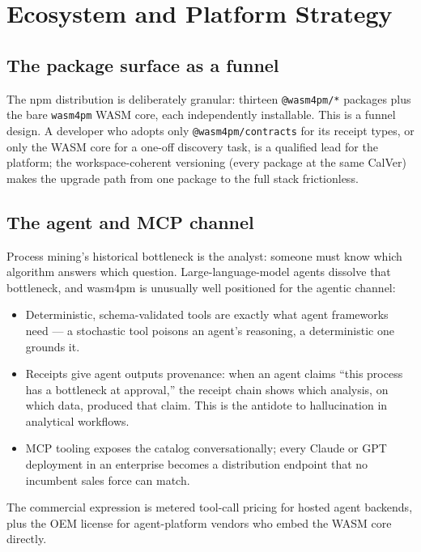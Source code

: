 \chapter{Ecosystem and Platform Strategy}
\label{ch:ecosystem}

\section{The package surface as a funnel}

The npm distribution is deliberately granular: thirteen
\texttt{@wasm4pm/*} packages plus the bare \texttt{wasm4pm} WASM core, each
independently installable. This is a funnel design. A developer who adopts
only \texttt{@wasm4pm/contracts} for its receipt types, or only the WASM
core for a one-off discovery task, is a qualified lead for the platform;
the workspace-coherent versioning (every package at the same CalVer)
makes the upgrade path from one package to the full stack frictionless.

\section{The agent and MCP channel}

Process mining's historical bottleneck is the analyst: someone must know
which algorithm answers which question. Large-language-model agents
dissolve that bottleneck, and wasm4pm is unusually well positioned for the
agentic channel:

\begin{itemize}[leftmargin=2em]
  \item Deterministic, schema-validated tools are exactly what agent
        frameworks need --- a stochastic tool poisons an agent's reasoning,
        a deterministic one grounds it.
  \item Receipts give agent outputs provenance: when an agent claims
        ``this process has a bottleneck at approval,'' the receipt chain
        shows which analysis, on which data, produced that claim. This is
        the antidote to hallucination in analytical workflows.
  \item MCP tooling exposes the catalog conversationally; every Claude or
        GPT deployment in an enterprise becomes a distribution endpoint
        that no incumbent sales force can match.
\end{itemize}

The commercial expression is metered tool-call pricing for hosted agent
backends, plus the OEM license for agent-platform vendors who embed the
WASM core directly.


